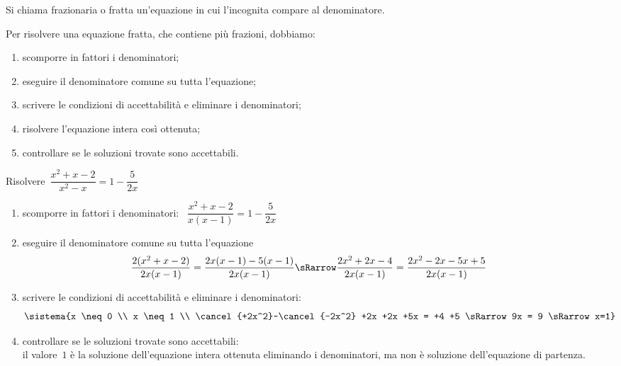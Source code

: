 \begin{definizione}{}{}
Si chiama frazionaria o fratta un'equazione in cui l'incognita compare 
al denominatore.
\end{definizione}

\begin{procedura}{}{}
Per risolvere una equazione fratta, che contiene più frazioni, dobbiamo:
\begin{enumerate}[nosep]
\item scomporre in fattori i denominatori;
\item eseguire il denominatore comune su tutta l'equazione;
\item scrivere le condizioni di accettabilità e eliminare i 
denominatori;
\item risolvere l'equazione intera così ottenuta;
\item controllare se le soluzioni trovate sono accettabili.
\end{enumerate}
\end{procedura}


\begin{esempio}{}{}
Risolvere~\(\dfrac{x^{2}+x-2}{x^{2}-x}=1-\dfrac{5}{2x}\)

\begin{enumerate}[left=0mm, nosep]
\item scomporre in fattori i denominatori:~
\(\dfrac{x^{2}+x-2}{x(x-1)}=1-\dfrac{5}{2x}\)

\item eseguire il denominatore comune su tutta l'equazione
\[\hspace*{-7mm}
\frac{2(x^{2}+x-2)}{2x(x-1)}=\frac{2x(x-1)-5(x-1)}{2x(x-1)} \sRarrow
\frac{2x^{2}+2x-4}{2x(x-1)}=\frac{2x^2-2x-5x+5}{2x(x-1)}\]

\item scrivere le condizioni di accettabilità e eliminare i 
denominatori:
\[\sistema{x \neq 0 \\ 
           x \neq 1 \\ 
           \cancel{+2x^2}~\cancel{-2x^2} +2x +2x +5x = +4 +5 \sRarrow
             9x = 9 \sRarrow x=1}\]


\item controllare se le soluzioni trovate sono accettabili:\\
il valore~\(1\) è la soluzione dell'equazione intera ottenuta eliminando 
i denominatori, ma non è soluzione dell'equazione di partenza.
\end{enumerate}
\end{esempio}
 
